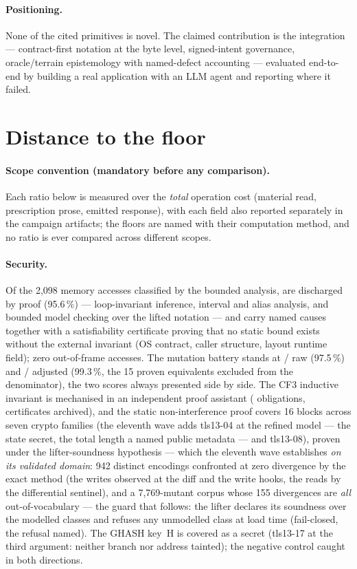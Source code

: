 \documentclass[11pt,a4paper]{article}
\begin{document}
\paragraph{Positioning.} None of the cited primitives is novel. The
claimed contribution is the integration --- contract-first notation at
the byte level, signed-intent governance, oracle/terrain epistemology
with named-defect accounting --- evaluated end-to-end by building a real
application with an LLM agent and reporting where it failed.

\section{Distance to the floor}\label{sec:floor}
\paragraph{Scope convention (mandatory before any comparison).}
Each ratio below is measured over the \emph{total} operation cost
(material read, prescription prose, emitted response), with each field
also reported separately in the campaign artifacts; the floors are
named with their computation method, and no ratio is ever compared
across different scopes.

\paragraph{Security.} Of the 2{,}098 memory accesses classified by the
bounded analysis, \sureteDecharges{} are discharged by proof (95.6\,\%)
--- loop-invariant inference, interval and alias analysis, and bounded
model checking over the lifted notation --- and \sureteNOMMES{} carry
named causes together with a satisfiability certificate proving that no
static bound exists without the external invariant (OS contract, caller
structure, layout runtime field); zero out-of-frame accesses. The
mutation battery stands at \mutationBrutNum/\mutationDenomBrut{} raw
(97.5\,\%) and \mutationAjusteNum/\mutationDenomAjuste{} adjusted
(99.3\,\%, the 15 proven equivalents excluded from the denominator),
the two scores always presented side by side. The CF3 inductive
invariant is mechanised in an independent proof assistant
(\cfTroisObligations{} obligations, certificates archived), and the
static non-interference proof covers 16 blocks across seven crypto
families (the eleventh wave adds tls13-04 at the refined model ---
the state secret, the total length a named public metadata --- and
tls13-08), proven under the lifter-soundness hypothesis --- which the
eleventh wave establishes \emph{on its validated domain}: 942 distinct
encodings confronted at zero divergence by the exact method (the
writes observed at the diff and the write hooks, the reads by the
differential sentinel), and a 7{,}769-mutant corpus whose 155
divergences are \emph{all} out-of-vocabulary --- the guard that
follows: the lifter declares its soundness over the modelled classes
and refuses any unmodelled class at load time (fail-closed, the
refusal named). The GHASH key~H is covered as a secret (tls13-17 at
the third argument: neither branch nor address tainted); the
negative control caught in both directions.
\end{document}
